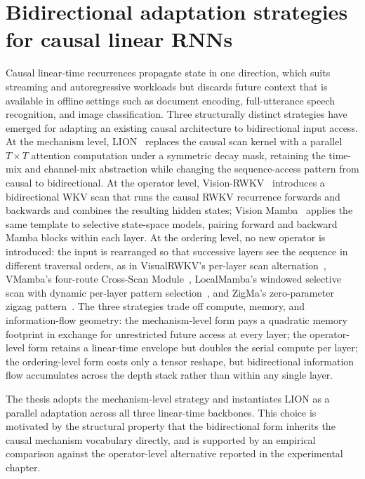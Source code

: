 \section{Bidirectional adaptation strategies for causal linear RNNs}

Causal linear-time recurrences propagate state in one direction,
which suits streaming and autoregressive workloads but discards
future context that is available in offline settings such as
document encoding, full-utterance speech recognition, and image
classification. Three structurally distinct strategies have
emerged for adapting an existing causal architecture to
bidirectional input access. At the mechanism level,
LION~\cite{afzal2025linear} replaces the causal scan kernel with
a parallel $T \times T$ attention computation under a symmetric
decay mask, retaining the time-mix and channel-mix abstraction
while changing the sequence-access pattern from causal to
bidirectional. At the operator level,
Vision-RWKV~\cite{duan2024visionrwkv} introduces a bidirectional
WKV scan that runs the causal RWKV recurrence forwards and
backwards and combines the resulting hidden states; Vision
Mamba~\cite{zhu2024visionmamba} applies the same template to
selective state-space models, pairing forward and backward Mamba
blocks within each layer. At the ordering level, no new operator
is introduced: the input is rearranged so that successive layers
see the sequence in different traversal orders, as in
VisualRWKV's per-layer scan alternation~\cite{hou2024visualrwkv},
VMamba's four-route Cross-Scan Module~\cite{liu2024vmamba},
LocalMamba's windowed selective scan with dynamic per-layer
pattern selection~\cite{huang2024localmamba}, and ZigMa's
zero-parameter zigzag pattern~\cite{hu2024zigma}. The three
strategies trade off compute, memory, and information-flow
geometry: the mechanism-level form pays a quadratic memory
footprint in exchange for unrestricted future access at every
layer; the operator-level form retains a linear-time envelope but
doubles the serial compute per layer; the ordering-level form
costs only a tensor reshape, but bidirectional information flow
accumulates across the depth stack rather than within any single
layer.

The thesis adopts the mechanism-level strategy and instantiates
LION as a parallel adaptation across all three linear-time
backbones. This choice is motivated by the structural property
that the bidirectional form inherits the causal mechanism
vocabulary directly, and is supported by an empirical comparison
against the operator-level alternative reported in the
experimental chapter.

